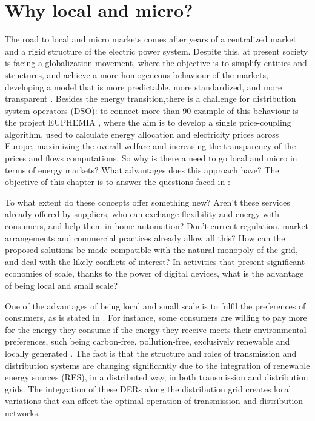 \section{Why local and micro?} \label{sec:why}
The road to local and micro markets comes after years of a centralized market and a rigid structure of the electric power system. Despite this, at present society is facing a globalization movement, where the objective is to simplify entities and structures, and achieve a more homogeneous behaviour of the markets, developing a model that is more predictable, more standardized, and more transparent \cite{Mallet2014}. Besides the energy transition,there is a challenge for distribution system operators (DSO): to connect more than 90%
example of this behaviour is the project EUPHEMIA \cite{EUPHEMIA2016}, where the aim is to develop a single price-coupling algorithm, used to calculate energy allocation and electricity prices across Europe, maximizing the overall welfare and increasing the transparency of the prices and flows computations. So why is there a need to go local and micro in terms of energy markets? What advantages does this approach have? The objective of this chapter is to answer the questions faced in \cite{DesignElectricityMarketRossetoo2017}:

\begin{tcolorbox}
To what extent do these concepts offer something new? Aren't these services already offered by suppliers, who can exchange flexibility and energy with consumers, and help them in home automation? Don't current regulation, market arrangements and commercial
practices already allow all this? How can the proposed solutions be made compatible with the natural monopoly of the grid, and deal with the likely conflicts of interest? In activities that present significant economies of scale, thanks to the power of digital devices, what is the advantage of being local and small scale?
\end{tcolorbox}

One of the advantages of being local and small scale is to fulfil the preferences of consumers, as is stated in \cite{faber2014micro}. For instance, some consumers are willing to pay more for the energy they consume if the energy they receive meets their environmental preferences, such being carbon-free, pollution-free, exclusively renewable and locally generated \cite{lane2013costing}. The fact is that the structure and roles of transmission and distribution systems are changing significantly due to the integration of renewable energy sources (RES), in a distributed way, in both transmission and distribution grids. The integration of these DERs along the distribution grid creates local variations that can affect the optimal operation of transmission and distribution networks.


